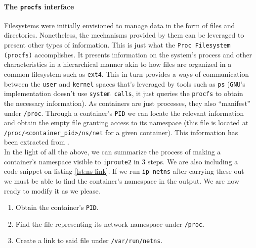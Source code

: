                 \paragraph{The \texttt{procfs} interface}
                    Filesystems were initially envisioned to manage data in the form of files and directories. Nonetheless, the mechanisms provided by them can be leveraged to present other types of information. This is just what the \texttt{Proc Filesystem (procfs)} accomplishes. It presents information on the system's process and other characteristics in a hierarchical manner akin to how files are organized in a common filesystem such as \texttt{ext4}. This in turn provides a ways of communication between the \texttt{user} and \texttt{kernel} spaces that's leveraged by tools such as \texttt{ps} (\texttt{GNU}'s implementation doesn't use \texttt{system calls}, it just queries the \texttt{procfs} to obtain the necessary information). As containers are just processes, they also ``manifest'' under \texttt{/proc}. Through a container's \texttt{PID} we can locate the relevant information and obtain the empty file granting access to its namespace (this file is located at \texttt{/proc/<container\_pid>/ns/net} for a given container). This information has been extracted from \cite{bib:man-procfs}.\\

                In the light of all the above, we can summarize the process of making a container's namespace visible to \texttt{iproute2} in $3$ steps. We are also including a code snippet on listing \ref{lst:ns-link}. If we run \texttt{ip netns} after carrying these out we must be able to find the container's namespace in the output. We are now ready to modify it as we please.\\

                \begin{enumerate}
                    \item Obtain the container's \texttt{PID}.
                    \item Find the file representing its network namespace under \texttt{/proc}.
                    \item Create a link to said file under \texttt{/var/run/netns}.
                \end{enumerate}

